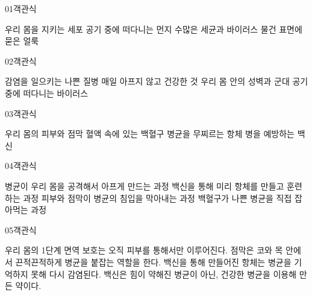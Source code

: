 \documentclass[fs95,seriesFre]{korfarm-base}
\begin{document}
\kfActivityBg \par{}\par\nopagebreak[4]\smallskip\nopagebreak[4]


\begin{kfQBlock}{01}{객관식}
\begin{kfChoices}
\kfChoice 우리 몸을 지키는 세포
\kfChoice 공기 중에 떠다니는 먼지
\kfChoice 수많은 세균과 바이러스
\kfChoice 물건 표면에 묻은 얼룩
\end{kfChoices}
\end{kfQBlock}
\begin{kfQBlock}{02}{객관식}
\begin{kfChoices}
\kfChoice 감염을 일으키는 나쁜 질병
\kfChoice 매일 아프지 않고 건강한 것
\kfChoice 우리 몸 안의 성벽과 군대
\kfChoice 공기 중에 떠다니는 바이러스
\end{kfChoices}
\end{kfQBlock}
\begin{kfQBlock}{03}{객관식}
\begin{kfChoices}
\kfChoice 우리 몸의 피부와 점막
\kfChoice 혈액 속에 있는 백혈구
\kfChoice 병균을 무찌르는 항체
\kfChoice 병을 예방하는 백신
\end{kfChoices}
\end{kfQBlock}
\begin{kfQBlock}{04}{객관식}
\begin{kfChoices}
\kfChoice 병균이 우리 몸을 공격해서 아프게 만드는 과정
\kfChoice 백신을 통해 미리 항체를 만들고 훈련하는 과정
\kfChoice 피부와 점막이 병균의 침입을 막아내는 과정
\kfChoice 백혈구가 나쁜 병균을 직접 잡아먹는 과정
\end{kfChoices}
\end{kfQBlock}
\begin{kfQBlock}{05}{객관식}
\begin{kfChoices}
\kfChoice 우리 몸의 1단계 면역 보호는 오직 피부를 통해서만 이루어진다.
\kfChoice 점막은 코와 목 안에서 끈적끈적하게 병균을 붙잡는 역할을 한다.
\kfChoice 백신을 통해 만들어진 항체는 병균을 기억하지 못해 다시 감염된다.
\kfChoice 백신은 힘이 약해진 병균이 아닌, 건강한 병균을 이용해 만든 약이다.
\end{kfChoices}
\end{kfQBlock}
\end{document}
